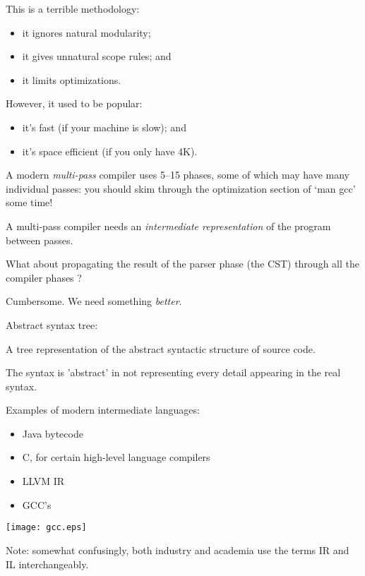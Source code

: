 \begin{slide*}
This is a terrible methodology:
\begin{itemize}
\item it ignores natural modularity;
\item it gives unnatural scope rules; and
\item it limits optimizations.
\end{itemize}

However, it used to be popular:
\begin{itemize}
\item it's fast (if your machine is slow); and
\item it's space efficient (if you only have 4K).
\end{itemize}

A modern {\em multi-pass} compiler uses 5--15 phases, some of which
may have many individual passes: you should skim through the
optimization section of `man gcc' some time!
\vfil
\end{slide*}
 
\begin{slide*}
A multi-pass compiler needs an {\em intermediate representation} of
the program between passes.

What about propagating the result of the parser phase (the CST) through
all the compiler phases ?


Cumbersome. We need something \emph{better}.
\vfil
\end{slide*}

\begin{slide*}
    Abstract syntax tree:

    A tree representation of the abstract syntactic structure of source code.

    The syntax is 'abstract' in not representing every detail appearing in the real syntax.

\vfil
\end{slide*}

\begin{slide*}
Examples of modern intermediate languages:
\begin{itemize}
\item Java bytecode
\item C, for certain high-level language compilers
\item LLVM IR
\item GCC's
\end{itemize}
\texttt{[image: gcc.eps]}

Note: somewhat confusingly, both industry and academia use the terms
IR and IL interchangeably.
\vfil
\end{slide*}

